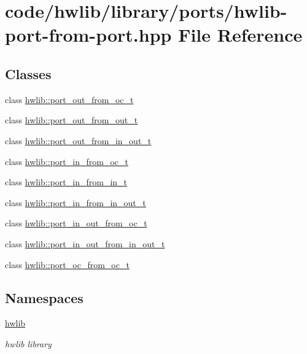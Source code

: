 \hypertarget{hwlib-port-from-port_8hpp}{}\section{code/hwlib/library/ports/hwlib-\/port-\/from-\/port.hpp File Reference}
\label{hwlib-port-from-port_8hpp}
\subsection*{Classes}
\begin{DoxyCompactItemize}
\item 
class \hyperlink{classhwlib_1_1port__out__from__oc__t}{hwlib\+::port\+\_\+out\+\_\+from\+\_\+oc\+\_\+t}
\item 
class \hyperlink{classhwlib_1_1port__out__from__out__t}{hwlib\+::port\+\_\+out\+\_\+from\+\_\+out\+\_\+t}
\item 
class \hyperlink{classhwlib_1_1port__out__from__in__out__t}{hwlib\+::port\+\_\+out\+\_\+from\+\_\+in\+\_\+out\+\_\+t}
\item 
class \hyperlink{classhwlib_1_1port__in__from__oc__t}{hwlib\+::port\+\_\+in\+\_\+from\+\_\+oc\+\_\+t}
\item 
class \hyperlink{classhwlib_1_1port__in__from__in__t}{hwlib\+::port\+\_\+in\+\_\+from\+\_\+in\+\_\+t}
\item 
class \hyperlink{classhwlib_1_1port__in__from__in__out__t}{hwlib\+::port\+\_\+in\+\_\+from\+\_\+in\+\_\+out\+\_\+t}
\item 
class \hyperlink{classhwlib_1_1port__in__out__from__oc__t}{hwlib\+::port\+\_\+in\+\_\+out\+\_\+from\+\_\+oc\+\_\+t}
\item 
class \hyperlink{classhwlib_1_1port__in__out__from__in__out__t}{hwlib\+::port\+\_\+in\+\_\+out\+\_\+from\+\_\+in\+\_\+out\+\_\+t}
\item 
class \hyperlink{classhwlib_1_1port__oc__from__oc__t}{hwlib\+::port\+\_\+oc\+\_\+from\+\_\+oc\+\_\+t}
\end{DoxyCompactItemize}
\subsection*{Namespaces}
\begin{DoxyCompactItemize}
\item 
 \hyperlink{namespacehwlib}{hwlib}
\begin{DoxyCompactList}\small\item\em hwlib library \end{DoxyCompactList}\end{DoxyCompactItemize}
